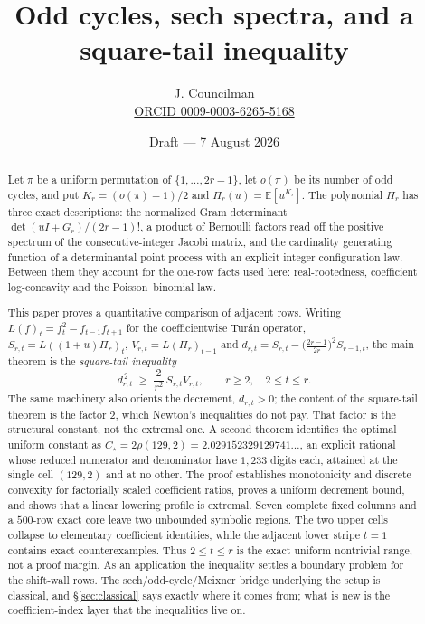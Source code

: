 \documentclass[11pt,a4paper]{article}
\title{\textbf{Odd cycles, sech spectra, and a\\ square-tail inequality}}
\author{J. Councilman\\
\small\href{https://orcid.org/0009-0003-6265-5168}{ORCID 0009-0003-6265-5168}}
\date{Draft --- 7 August 2026}
\theoremstyle{plain}
\theoremstyle{definition}
\theoremstyle{remark}
\newcommand{\E}{\mathbb{E}}
\begin{document}
\maketitle

\begin{abstract}
Let $\pi$ be a uniform permutation of $\{1,\dots,2r-1\}$, let $o(\pi)$ be its
number of odd cycles, and put $K_r=(o(\pi)-1)/2$ and $\Pi_r(u)=\E[u^{K_r}]$. The
polynomial $\Pi_r$ has three exact descriptions: the normalized Gram determinant
$\det(uI+G_r)/(2r-1)!$, a product of Bernoulli factors read
off the positive spectrum of the consecutive-integer Jacobi matrix, and the
cardinality generating function of a determinantal point process with an
explicit integer configuration law. Between them they account for
the one-row facts used here: real-rootedness, coefficient log-concavity and the
Poisson--binomial law.

This paper proves a quantitative comparison of adjacent rows. Writing
$L(f)_t=f_t^2-f_{t-1}f_{t+1}$ for the coefficientwise Tur\'an operator,
$S_{r,t}=L((1+u)\Pi_r)_t$, $V_{r,t}=L(\Pi_r)_{t-1}$ and
$d_{r,t}=S_{r,t}-\bigl(\tfrac{2r-1}{2r}\bigr)^2S_{r-1,t}$, the main theorem is
the \emph{square-tail inequality}
\[
  d_{r,t}^{\,2}\;\ge\;\frac{2}{r^2}\,S_{r,t}V_{r,t},
  \qquad r\ge2,\quad 2\le t\le r .
\]
The same machinery also orients the decrement, $d_{r,t}>0$; the content of the
square-tail theorem is the factor $2$, which Newton's inequalities do not pay.
That factor is the structural constant, not the extremal one. A second theorem
identifies the optimal uniform constant as
$C_\star=2\rho(129,2)=2.029152329129741\ldots$, an explicit rational whose
reduced numerator and denominator have $1{,}233$ digits each, attained at the
single cell $(129,2)$ and at no other.
The proof establishes monotonicity and discrete convexity for factorially
scaled coefficient ratios, proves a uniform decrement bound, and shows that a
linear lowering profile is extremal. Seven complete fixed columns and a
$500$-row exact core leave two unbounded symbolic regions. The two upper cells
collapse to elementary coefficient identities,
while the adjacent lower stripe $t=1$ contains exact counterexamples. Thus
$2\le t\le r$ is the exact uniform nontrivial range, not a proof margin. As an
application the inequality settles a boundary problem for the shift-wall rows.
The sech/odd-cycle/Meixner bridge underlying the setup is classical, and
\S\ref{sec:classical} says exactly where it comes from; what is new is the
coefficient-index layer that the inequalities live on.
\end{abstract}
\end{document}
